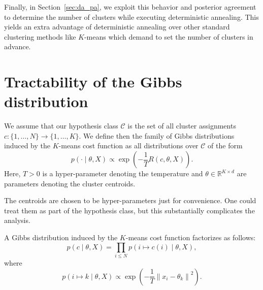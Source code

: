 Finally, in Section~\ref{sec:da_pa}, we exploit this behavior and posterior agreement to determine the number of clusters while executing deterministic annealing. This yields an extra advantage of deterministic annealing over other standard clustering methods like $K$-means which demand to set the number of clusters in advance.

\section{Tractability of the Gibbs distribution}
\label{sec:gibbs_factorizes_da}

We assume that our hypothesis class $\mathcal{C}$ is the set of all cluster assignments $c : \{1, \ldots, N\} \to \{1, \ldots, K\}$.
We define then the family of Gibbs distributions
induced by the $K$-means cost function as all distributions over $\mathcal{C}$ of the
form
%
\begin{equation}
p(\cdot \mid \theta, X) \propto \exp\left(-\frac{1}{T}R(c, \theta, X)\right).
\label{eq:gibbs_distr}
\end{equation}
%
Here, $T > 0$ is a hyper-parameter denoting the temperature and $\theta \in \mathbb{R}^{K \times d}$ are parameters denoting the cluster centroids. 

The centroids are chosen to be hyper-parameters just for convenience.
One could treat them as part of the hypothesis class, but this substantially complicates the analysis.

\begin{theorem}
A Gibbs distribution induced by the $K$-means cost function
factorizes as follows:
%
\begin{equation}
p(c \mid \theta, X) = \prod_{i \leq N} p(i \mapsto c(i) \mid \theta, X),
\label{eq:gibbs_distr_factorizes}
\end{equation}
%
where
%
\begin{equation}
p(i \mapsto k \mid \theta, X) \propto \exp\left(-\frac{1}{T}\left\|x_i - \theta_{k}\right\|^2\right).
\label{eq:gibbs_factors_da}
\end{equation}
%
\label{thm:gibbs_factorizes}
\end{theorem}


